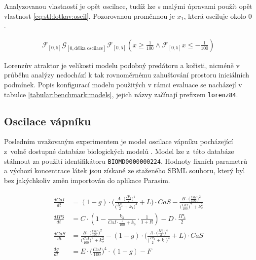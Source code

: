 Analyzovanou vlastností je opět oscilace, tudíž lze s malými úpravami použít opět
vlastnost \ref{eq:stl:lotkav:oscil}. Pozorovanou proměnnou je $x_1$, která
osciluje okolo $0$. 

\begin{align}
\label{eq:model:stl:lorenz84}
\mathcal{F}_{[0, 5]}\mathcal{G}_{[0, \textrm{délka oscilace}]}\mathcal{F}_{[0, 5]}(x \geq \frac{1}{100} \wedge \mathcal{F}_{[0, 5]}x \leq -\frac{1}{100})
\end{align}

Lorenzův atraktor je velikostí modelu podobný predátoru a kořisti, nic\-mé\-ně v průběhu
analýzy nedochází k tak rovnoměrnému zahušťování prostoru iniciálních podmínek.
Popis konfigurací modelu použitých v rámci evaluace  se nacházejí v tabulce \ref{tabular:benchmark:models},
jejich názvy začínají prefixem \texttt{lorenz84}.

\subsection{Oscilace vápníku}

Posledním uvažovaným experimentem je model oscilace vápníku \cite{meyer1991} po\-chá\-ze\-jí\-cí z~volně dostupné databáze biologických modelů \cite{biomodels}.
Model lze z~této databáze stáhnout za použití identifikátoru \texttt{BIOMD0000000224}.
Hodnoty fix\-ních parametrů a výchozí koncentrace látek jsou získané ze sta\-že\-né\-ho SBML souboru,
který byl bez jakýchkoliv změn importován do aplikace Parasim.

\begin{align}\label{eq:model:ode:meyer91}
\begin{array}{ll}
\frac{dCaI}{dt} &= (1 - g) \cdot \bigg(\frac{A \cdot \big(\frac{IP_3}{2}\big)^4}{\big(\frac{IP_3}{2} + k_1\big)^4} + L\bigg) \cdot CaS - \frac{B \cdot \big(\frac{CaI}{100}\big) ^ 2}{\big(\frac{CaI}{100}\big) ^ 2 + k_2 ^ 2}\\
\frac{dIP3}{dt} &= C \cdot (1 - \frac{k_3}{CaI \cdot \frac{1}{100} + k_3} \cdot \frac{1}{1 + R} ) - D \cdot \frac{IP_3}{2}	\\
\frac{dCaS}{dt} &= \frac{B \cdot \big(\frac{CaI}{100}\big) ^ 2}{\big(\frac{CaI}{100}\big) ^ 2 + k_2 ^ 2} - (1 - g) \cdot \bigg(\frac{A \cdot \big(\frac{IP_3}{2}\big)^4}{\big(\frac{IP_3}{2} + k_1\big)^4} + L\bigg) \cdot CaS	\\
\frac{dg}{dt}   &= E \cdot \big(\frac{CaI}{100}\big) ^ 4 \cdot (1 - g) - F
\end{array}
\end{align}


